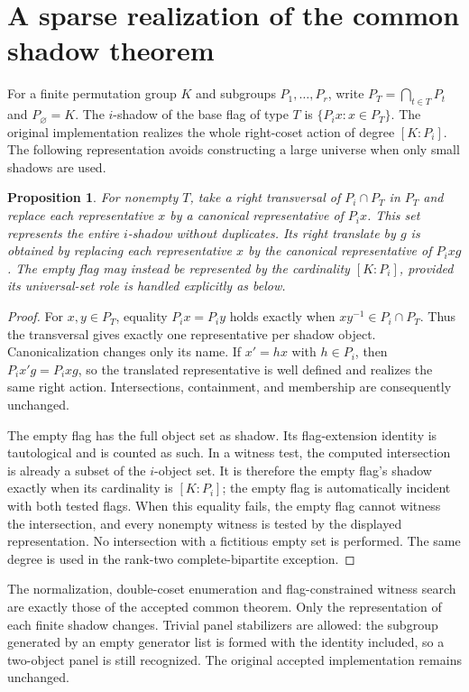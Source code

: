 \documentclass[11pt,a4paper]{article}
\newtheorem{proposition}{Proposition}\newtheorem{theorem}[proposition]{Theorem}
\begin{document}
\section{A sparse realization of the common shadow theorem}
For a finite permutation group $K$ and subgroups $P_1,\ldots,P_r$, write
$P_T=\bigcap_{t\in T}P_t$ and $P_\varnothing=K$. The $i$-shadow of the
base flag of type $T$ is $\{P_i x:x\in P_T\}$. The original implementation
realizes the whole right-coset action of degree $[K:P_i]$. The following
representation avoids constructing a large universe when only small
shadows are used.
\begin{proposition}
For nonempty $T$, take a right transversal of $P_i\cap P_T$ in $P_T$ and
replace each representative $x$ by a canonical representative of $P_i x$.
This set represents the entire $i$-shadow without duplicates. Its right
translate by $g$ is obtained by replacing each representative $x$ by the
canonical representative of $P_i xg$. The empty flag may instead be
represented by the cardinality $[K:P_i]$, provided its universal-set role
is handled explicitly as below.
\end{proposition}
\begin{proof}
For $x,y\in P_T$, equality $P_i x=P_i y$ holds exactly when
$xy^{-1}\in P_i\cap P_T$. Thus the transversal gives exactly one
representative per shadow object. Canonicalization changes only its name.
If $x'=hx$ with $h\in P_i$, then $P_i x'g=P_i xg$, so the translated
representative is well defined and realizes the same right action.
Intersections, containment, and membership are consequently unchanged.

The empty flag has the full object set as shadow. Its flag-extension
identity is tautological and is counted as such. In a witness test, the
computed intersection is already a subset of the $i$-object set. It is
therefore the empty flag's shadow exactly when its cardinality is
$[K:P_i]$; the empty flag is automatically incident with both tested flags.
When this equality fails, the empty flag cannot witness the intersection,
and every nonempty witness is tested by the displayed representation.
No intersection with a fictitious empty set is performed. The same degree
is used in the rank-two complete-bipartite exception.
\end{proof}
The normalization, double-coset enumeration and flag-constrained witness
search are exactly those of the accepted common theorem. Only the
representation of each finite shadow changes. Trivial panel stabilizers
are allowed: the subgroup generated by an empty generator list is formed
with the identity included, so a two-object panel is still recognized.
The original accepted implementation remains unchanged.
\end{document}
